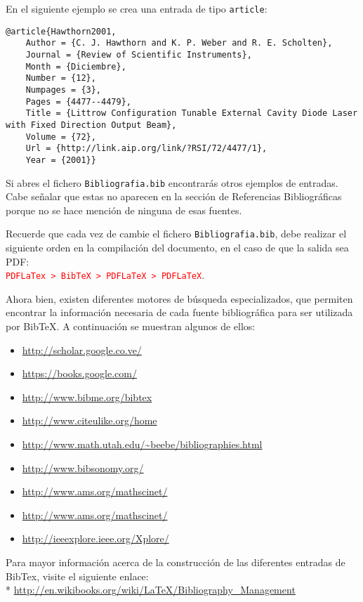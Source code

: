 En el siguiente ejemplo se crea una entrada de tipo \texttt{article}: 

\bigskip

\begin{lstlisting}[frame=single]
@article{Hawthorn2001,
	Author = {C. J. Hawthorn and K. P. Weber and R. E. Scholten},
	Journal = {Review of Scientific Instruments},
	Month = {Diciembre},
	Number = {12},
	Numpages = {3},
	Pages = {4477--4479},
	Title = {Littrow Configuration Tunable External Cavity Diode Laser with Fixed Direction Output Beam},
	Volume = {72},
	Url = {http://link.aip.org/link/?RSI/72/4477/1},
	Year = {2001}}
\end{lstlisting}

Si abres el fichero \texttt{Bibliografia.bib} encontrarás otros ejemplos de entradas. Cabe señalar que estas no aparecen en la sección de Referencias Bibliográficas porque no se hace mención de ninguna de esas fuentes.

Recuerde que cada vez de cambie el fichero \texttt{Bibliografia.bib}, debe realizar el siguiente orden en la compilación del documento, en el caso de que la salida sea PDF:\\
\textcolor{red}{\texttt{PDFLaTex > BibTeX > PDFLaTeX > PDFLaTeX}}.

Ahora bien, existen diferentes motores de búsqueda especializados, que permiten encontrar la información necesaria de cada fuente bibliográfica para ser utilizada por BibTeX. A continuación se muestran algunos de ellos:


\begin{itemize}
\item \url{http://scholar.google.co.ve/}
\item \url{https://books.google.com/}
\item \url{http://www.bibme.org/bibtex}
\item \url{http://www.citeulike.org/home}
\item \url{http://www.math.utah.edu/~beebe/bibliographies.html}
\item \url{http://www.bibsonomy.org/}
\item \url{http://www.ams.org/mathscinet/}
\item \url{http://www.ams.org/mathscinet/}
\item \url{http://ieeexplore.ieee.org/Xplore/}
\end{itemize}

\noindent Para mayor información acerca de la construcción de las diferentes entradas de BibTex, visite el siguiente enlace: \\*
\url{http://en.wikibooks.org/wiki/LaTeX/Bibliography_Management}

